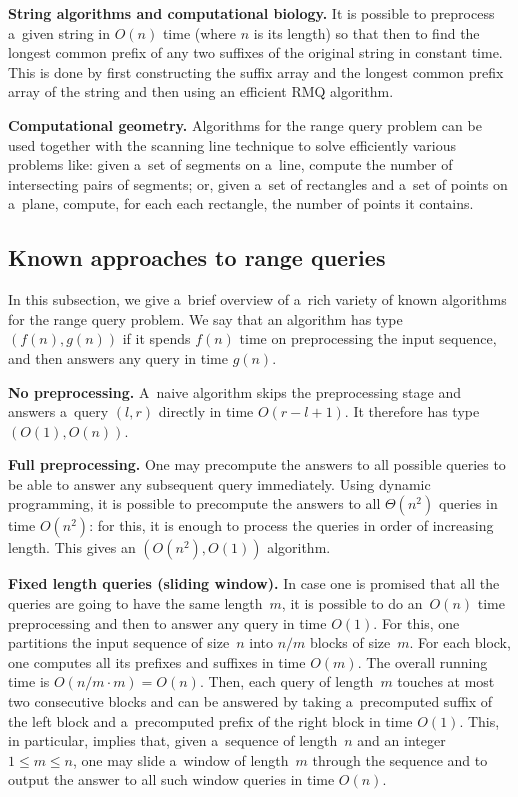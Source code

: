 \documentclass{toc}
\begin{document}
\textbf{String algorithms and computational biology.}
It is possible to preprocess a~given string in $O(n)$ time (where $n$ is its length)
so that %
then to  %
find the longest common prefix of any two suffixes of the original string in constant time. This is done by first constructing the suffix array and the longest common prefix array of the string and then using an efficient RMQ algorithm.

\textbf{Computational geometry.} Algorithms for the range %
query  %
problem
can be used together with the scanning line technique to solve efficiently various problems like: given a~set of segments on a~line, compute the number of intersecting pairs of segments; or, given a~set of rectangles and a~set of points on a~plane, compute, for each each rectangle, the number of points it contains.

\subsection{Known approaches to range queries}\label{subsec:approaches}

In this subsection, we give a~brief overview of a~rich variety of known
algorithms for the 
range query
problem. We say that an algorithm has type
$(f(n), g(n))$ if it spends $f(n)$ time on preprocessing the input sequence,
and then answers any query in time $g(n)$.

\textbf{No preprocessing.} A~naive algorithm skips the preprocessing stage and
answers a~query $(l,r)$ directly in time $O(r-l+1)$. It therefore has type
$(O(1), O(n))$.

\textbf{Full preprocessing.} One may precompute the answers to all possible
queries to be able to answer any subsequent query immediately. Using dynamic
programming, it is possible to precompute the answers to all $\Theta(n^2)$
queries in time $O(n^2)$: for this, it is enough to process the queries in
order of increasing length. This gives an $(O(n^2), O(1))$ algorithm.

\textbf{Fixed length queries (sliding window).} In case one is promised that all
the queries are going to have the same length~$m$, it is possible to do
an~$O(n)$ time preprocessing and then to answer any query in time $O(1)$. For
this, one partitions the input sequence of size~$n$ into $n/m$ blocks of
size~$m$. For each block, one computes all its prefixes and suffixes in time
$O(m)$. The overall running time is $O(n/m \cdot m)=O(n)$. Then, each query
of length~$m$ touches at most two consecutive blocks and can be answered by
taking a~precomputed suffix of the left block and a~precomputed prefix of the
right block in time $O(1)$. This, in particular, implies that, given a~sequence
of length~$n$ and an integer $1 \le m \le n$, one may slide a~window of
length~$m$ through the sequence and to output the answer to all such window
queries in time $O(n)$.
\end{document}
